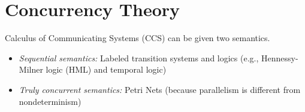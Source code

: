 






\section{Concurrency Theory}

\begin{remark}
    Calculus of Communicating Systems (CCS) can be given two semantics.
\begin{itemize}
\item \emph{Sequential semantics:} 
		Labeled transition systems and logics (e.g., Hennessy-Milner logic (HML) and temporal logic)
\item \emph{Truly concurrent semantics:} 
        Petri Nets (because parallelism is different from nondeterminism)
\end{itemize}
\end{remark}


